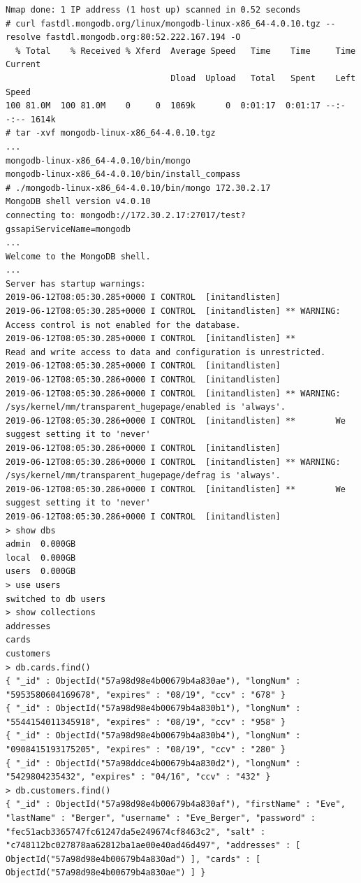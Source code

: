 \begin{lstlisting}
Nmap done: 1 IP address (1 host up) scanned in 0.52 seconds
# curl fastdl.mongodb.org/linux/mongodb-linux-x86_64-4.0.10.tgz --resolve fastdl.mongodb.org:80:52.222.167.194 -O
  % Total    % Received % Xferd  Average Speed   Time    Time     Time  Current
                                 Dload  Upload   Total   Spent    Left  Speed
100 81.0M  100 81.0M    0     0  1069k      0  0:01:17  0:01:17 --:--:-- 1614k
# tar -xvf mongodb-linux-x86_64-4.0.10.tgz
...
mongodb-linux-x86_64-4.0.10/bin/mongo
mongodb-linux-x86_64-4.0.10/bin/install_compass
# ./mongodb-linux-x86_64-4.0.10/bin/mongo 172.30.2.17
MongoDB shell version v4.0.10
connecting to: mongodb://172.30.2.17:27017/test?gssapiServiceName=mongodb
...
Welcome to the MongoDB shell.
...
Server has startup warnings:
2019-06-12T08:05:30.285+0000 I CONTROL  [initandlisten]
2019-06-12T08:05:30.285+0000 I CONTROL  [initandlisten] ** WARNING: Access control is not enabled for the database.
2019-06-12T08:05:30.285+0000 I CONTROL  [initandlisten] **          Read and write access to data and configuration is unrestricted.
2019-06-12T08:05:30.285+0000 I CONTROL  [initandlisten]
2019-06-12T08:05:30.286+0000 I CONTROL  [initandlisten]
2019-06-12T08:05:30.286+0000 I CONTROL  [initandlisten] ** WARNING: /sys/kernel/mm/transparent_hugepage/enabled is 'always'.
2019-06-12T08:05:30.286+0000 I CONTROL  [initandlisten] **        We suggest setting it to 'never'
2019-06-12T08:05:30.286+0000 I CONTROL  [initandlisten]
2019-06-12T08:05:30.286+0000 I CONTROL  [initandlisten] ** WARNING: /sys/kernel/mm/transparent_hugepage/defrag is 'always'.
2019-06-12T08:05:30.286+0000 I CONTROL  [initandlisten] **        We suggest setting it to 'never'
2019-06-12T08:05:30.286+0000 I CONTROL  [initandlisten]
> show dbs
admin  0.000GB
local  0.000GB
users  0.000GB
> use users
switched to db users
> show collections
addresses
cards
customers
> db.cards.find()
{ "_id" : ObjectId("57a98d98e4b00679b4a830ae"), "longNum" : "5953580604169678", "expires" : "08/19", "ccv" : "678" }
{ "_id" : ObjectId("57a98d98e4b00679b4a830b1"), "longNum" : "5544154011345918", "expires" : "08/19", "ccv" : "958" }
{ "_id" : ObjectId("57a98d98e4b00679b4a830b4"), "longNum" : "0908415193175205", "expires" : "08/19", "ccv" : "280" }
{ "_id" : ObjectId("57a98ddce4b00679b4a830d2"), "longNum" : "5429804235432", "expires" : "04/16", "ccv" : "432" }
> db.customers.find()
{ "_id" : ObjectId("57a98d98e4b00679b4a830af"), "firstName" : "Eve", "lastName" : "Berger", "username" : "Eve_Berger", "password" : "fec51acb3365747fc61247da5e249674cf8463c2", "salt" : "c748112bc027878aa62812ba1ae00e40ad46d497", "addresses" : [ ObjectId("57a98d98e4b00679b4a830ad") ], "cards" : [ ObjectId("57a98d98e4b00679b4a830ae") ] }

\end{lstlisting}
